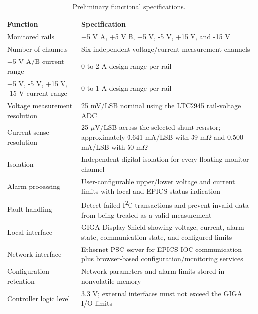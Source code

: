 \begin{table}[H]
    \centering
    \caption{Preliminary functional specifications.}
    \label{tab:functional-specifications}
    \begin{tabularx}{\textwidth}{>{\raggedright\arraybackslash}p{}X}
        \toprule
        \textbf{Function} & \textbf{Specification} \\
        \midrule
        Monitored rails & +5 V A, +5 V B, +5 V, -5 V, +15 V, and -15 V \\
        Number of channels & Six independent voltage/current measurement channels \\
        +5 V A/B current range & 0 to 2 A design range per rail \\
        +5 V, -5 V, +15 V, -15 V current range & 0 to 1 A design range per rail \\
        Voltage measurement resolution & 25 mV/LSB nominal using the LTC2945 rail-voltage ADC \\
        Current-sense resolution & 25 \(\mu\)V/LSB across the selected shunt resistor; approximately 0.641 mA/LSB with 39 m\(\Omega\) and 0.500 mA/LSB with 50 m\(\Omega\) \\
        Isolation & Independent digital isolation for every floating monitor channel \\
        Alarm processing & User-configurable upper/lower voltage and current limits with local and EPICS status indication \\
        Fault handling & Detect failed I\textsuperscript{2}C transactions and prevent invalid data from being treated as a valid measurement \\
        Local interface & GIGA Display Shield showing voltage, current, alarm state, communication state, and configured limits \\
        Network interface & Ethernet PSC server for EPICS IOC communication plus browser-based configuration/monitoring services \\
        Configuration retention & Network parameters and alarm limits stored in nonvolatile memory \\
        Controller logic level & 3.3 V; external interfaces must not exceed the GIGA I/O limits \\
        \bottomrule
    \end{tabularx}
\end{table}

